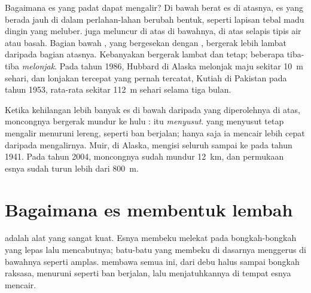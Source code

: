 Bagaimana es yang padat dapat mengalir? Di bawah berat es di atasnya, es
yang berada jauh di dalam  perlahan-lahan berubah bentuk, seperti
lapisan tebal madu dingin yang meluber.  juga meluncur di atas
 di bawahnya, di atas selapis tipis air atau  basah. Bagian
bawah , yang bergesekan dengan , bergerak lebih lambat
daripada bagian atasnya. Kebanyakan  bergerak lambat dan tetap;
beberapa tiba-tiba \emph{melonjak}. Pada tahun 1986,  Hubbard di
Alaska melonjak maju sekitar \qty{10}{m} sehari, dan lonjakan tercepat
yang pernah tercatat,  Kutiah di Pakistan pada tahun 1953,
rata-rata sekitar \qty{112}{m} sehari selama tiga bulan.

Ketika  kehilangan lebih banyak es di bawah daripada yang
diperolehnya di atas, moncongnya bergerak mundur ke hulu : 
itu \emph{menyusut}.  yang menyusut tetap mengalir menuruni lereng,
seperti ban berjalan; hanya saja ia mencair lebih cepat daripada
mengalirnya.  Muir, di Alaska, mengisi seluruh  sampai ke
 pada tahun 1941. Pada tahun 2004, moncongnya sudah mundur
\qty{12}{km}, dan permukaan esnya sudah turun lebih dari \qty{800}{m}.

\section{Bagaimana es membentuk lembah}

 adalah alat  yang sangat kuat. Esnya membeku melekat pada
bongkah-bongkah  yang lepas lalu mencabutnya; batu-batu yang
membeku di dasarnya menggerus  di bawahnya seperti amplas. 
membawa semua  ini, dari debu halus sampai bongkah raksasa,
menuruni  seperti ban berjalan, lalu menjatuhkannya di tempat esnya
mencair.

